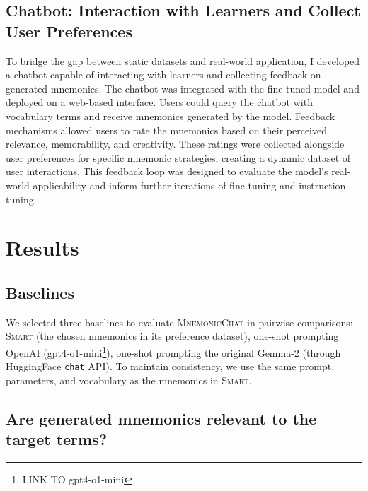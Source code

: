 \documentclass{article}
\newcounter{para}
\begin{document}

\subsection{Chatbot: Interaction with Learners and Collect User Preferences} \label{sec:met-chatbot}

To bridge the gap between static datasets and real-world application, I developed a chatbot capable of interacting with learners and collecting feedback on generated mnemonics. The chatbot was integrated with the fine-tuned model and deployed on a web-based interface. Users could query the chatbot with vocabulary terms and receive mnemonics generated by the model. Feedback mechanisms allowed users to rate the mnemonics based on their perceived relevance, memorability, and creativity. These ratings were collected alongside user preferences for specific mnemonic strategies, creating a dynamic dataset of user interactions. This feedback loop was designed to evaluate the model’s real-world applicability and inform further iterations of fine-tuning and instruction-tuning.

\section{Results} \label{sec:results}
\subsection{Baselines} \label{sec:baselines}
We selected three baselines to evaluate \textsc{MnemonicChat} in pairwise comparisons: \textsc{Smart} (the chosen mnemonics in its preference dataset), one-shot prompting OpenAI (gpt4-o1-mini\footnote{LINK TO gpt4-o1-mini}), one-shot prompting the original Gemma-2 (through HuggingFace \verb|chat| API). To maintain consistency, we use the same prompt, parameters, and vocabulary as the mnemonics in \textsc{Smart}.

\subsection{Are generated mnemonics relevant to the target terms?} \label{sec:relevant}

\end{document}
